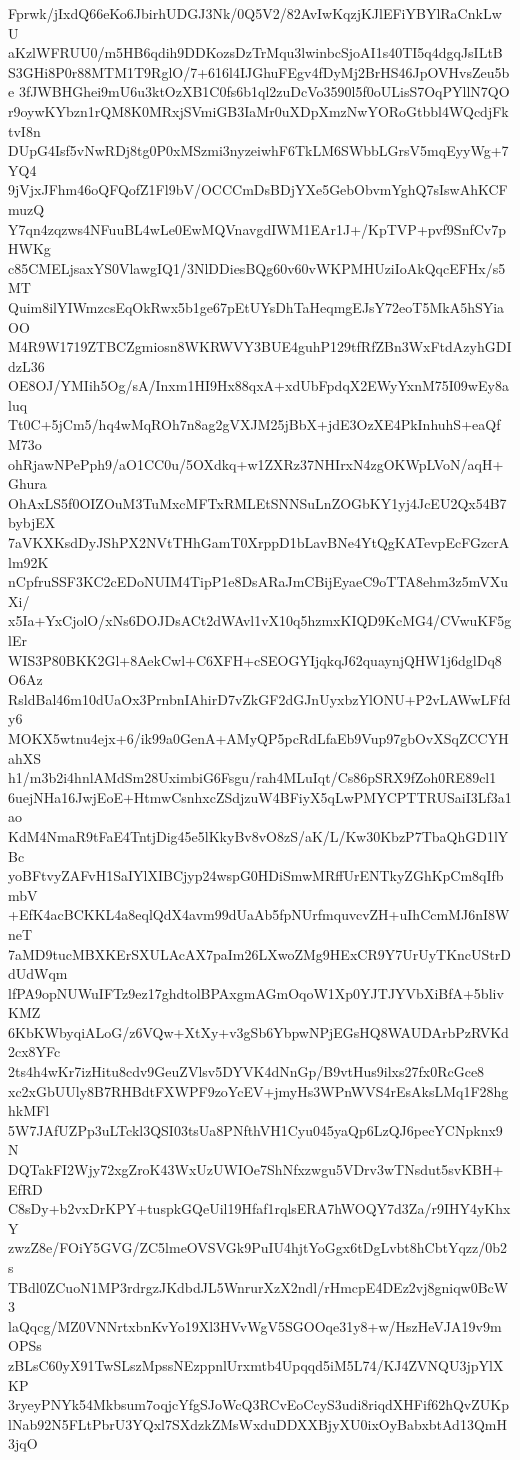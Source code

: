 Fprwk/jIxdQ66eKo6JbirhUDGJ3Nk/0Q5V2/82AvIwKqzjKJlEFiYBYlRaCnkLwU
aKzlWFRUU0/m5HB6qdih9DDKozsDzTrMqu3lwinbcSjoAI1s40TI5q4dgqJsILtB
S3GHi8P0r88MTM1T9RglO/7+616l4IJGhuFEgv4fDyMj2BrHS46JpOVHvsZeu5be
3fJWBHGhei9mU6u3ktOzXB1C0fs6b1ql2zuDcVo3590l5f0oULisS7OqPYllN7QO
r9oywKYbzn1rQM8K0MRxjSVmiGB3IaMr0uXDpXmzNwYORoGtbbl4WQcdjFktvI8n
DUpG4Isf5vNwRDj8tg0P0xMSzmi3nyzeiwhF6TkLM6SWbbLGrsV5mqEyyWg+7YQ4
9jVjxJFhm46oQFQofZ1Fl9bV/OCCCmDsBDjYXe5GebObvmYghQ7sIswAhKCFmuzQ
Y7qn4zqzws4NFuuBL4wLe0EwMQVnavgdIWM1EAr1J+/KpTVP+pvf9SnfCv7pHWKg
c85CMELjsaxYS0VlawgIQ1/3NlDDiesBQg60v60vWKPMHUziIoAkQqcEFHx/s5MT
Quim8ilYIWmzcsEqOkRwx5b1ge67pEtUYsDhTaHeqmgEJsY72eoT5MkA5hSYiaOO
M4R9W1719ZTBCZgmiosn8WKRWVY3BUE4guhP129tfRfZBn3WxFtdAzyhGDIdzL36
OE8OJ/YMIih5Og/sA/Inxm1HI9Hx88qxA+xdUbFpdqX2EWyYxnM75I09wEy8aluq
Tt0C+5jCm5/hq4wMqROh7n8ag2gVXJM25jBbX+jdE3OzXE4PkInhuhS+eaQfM73o
ohRjawNPePph9/aO1CC0u/5OXdkq+w1ZXRz37NHIrxN4zgOKWpLVoN/aqH+Ghura
OhAxLS5f0OIZOuM3TuMxcMFTxRMLEtSNNSuLnZOGbKY1yj4JcEU2Qx54B7bybjEX
7aVKXKsdDyJShPX2NVtTHhGamT0XrppD1bLavBNe4YtQgKATevpEcFGzcrAlm92K
nCpfruSSF3KC2cEDoNUIM4TipP1e8DsARaJmCBijEyaeC9oTTA8ehm3z5mVXuXi/
x5Ia+YxCjolO/xNs6DOJDsACt2dWAvl1vX10q5hzmxKIQD9KcMG4/CVwuKF5glEr
WIS3P80BKK2Gl+8AekCwl+C6XFH+cSEOGYIjqkqJ62quaynjQHW1j6dglDq8O6Az
RsldBal46m10dUaOx3PrnbnIAhirD7vZkGF2dGJnUyxbzYlONU+P2vLAWwLFfdy6
MOKX5wtnu4ejx+6/ik99a0GenA+AMyQP5pcRdLfaEb9Vup97gbOvXSqZCCYHahXS
h1/m3b2i4hnlAMdSm28UximbiG6Fsgu/rah4MLuIqt/Cs86pSRX9fZoh0RE89cl1
6uejNHa16JwjEoE+HtmwCsnhxcZSdjzuW4BFiyX5qLwPMYCPTTRUSaiI3Lf3a1ao
KdM4NmaR9tFaE4TntjDig45e5lKkyBv8vO8zS/aK/L/Kw30KbzP7TbaQhGD1lYBc
yoBFtvyZAFvH1SaIYlXIBCjyp24wspG0HDiSmwMRffUrENTkyZGhKpCm8qIfbmbV
+EfK4acBCKKL4a8eqlQdX4avm99dUaAb5fpNUrfmquvcvZH+uIhCcmMJ6nI8WneT
7aMD9tucMBXKErSXULAcAX7paIm26LXwoZMg9HExCR9Y7UrUyTKncUStrDdUdWqm
lfPA9opNUWuIFTz9ez17ghdtolBPAxgmAGmOqoW1Xp0YJTJYVbXiBfA+5blivKMZ
6KbKWbyqiALoG/z6VQw+XtXy+v3gSb6YbpwNPjEGsHQ8WAUDArbPzRVKd2cx8YFc
2ts4h4wKr7izHitu8cdv9GeuZVlsv5DYVK4dNnGp/B9vtHus9ilxs27fx0RcGce8
xc2xGbUUly8B7RHBdtFXWPF9zoYcEV+jmyHs3WPnWVS4rEsAksLMq1F28hghkMFl
5W7JAfUZPp3uLTckl3QSI03tsUa8PNfthVH1Cyu045yaQp6LzQJ6pecYCNpknx9N
DQTakFI2Wjy72xgZroK43WxUzUWIOe7ShNfxzwgu5VDrv3wTNsdut5svKBH+EfRD
C8sDy+b2vxDrKPY+tuspkGQeUil19Hfaf1rqlsERA7hWOQY7d3Za/r9IHY4yKhxY
zwzZ8e/FOiY5GVG/ZC5lmeOVSVGk9PuIU4hjtYoGgx6tDgLvbt8hCbtYqzz/0b2s
TBdl0ZCuoN1MP3rdrgzJKdbdJL5WnrurXzX2ndl/rHmcpE4DEz2vj8gniqw0BcW3
laQqcg/MZ0VNNrtxbnKvYo19Xl3HVvWgV5SGOOqe31y8+w/HszHeVJA19v9mOPSs
zBLsC60yX91TwSLszMpssNEzppnlUrxmtb4Upqqd5iM5L74/KJ4ZVNQU3jpYlXKP
3ryeyPNYk54Mkbsum7oqjcYfgSJoWcQ3RCvEoCcyS3udi8riqdXHFif62hQvZUKp
lNab92N5FLtPbrU3YQxl7SXdzkZMsWxduDDXXBjyXU0ixOyBabxbtAd13QmH3jqO
